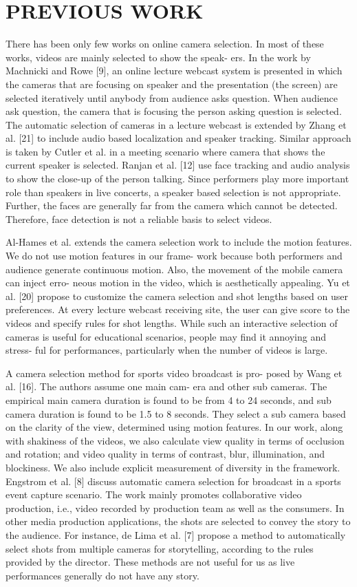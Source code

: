 \documentclass{sig-alternate}
\begin{document}
\section{PREVIOUS WORK}
There has been only few works on online camera selection. In
most of these works, videos are mainly selected to show the speak-
ers. In the work by Machnicki and Rowe [9], an online lecture
webcast system is presented in which the cameras that are focusing
on speaker and the presentation (the screen) are selected iteratively
until anybody from audience asks question. When audience ask
question, the camera that is focusing the person asking question is
selected. The automatic selection of cameras in a lecture webcast
is extended by Zhang et al. [21] to include audio based localization
and speaker tracking. Similar approach is taken by Cutler et al. \cite{asd:zxc}
in a meeting scenario where camera that shows the current speaker
is selected. Ranjan et al. [12] use face tracking and audio analysis to show the close-up of the person talking. Since performers play more important role than speakers in live concerts, a speaker
based selection is not appropriate. Further, the faces are generally
far from the camera which cannot be detected. Therefore, face detection is not a reliable basis to select videos.

Al-Hames et al. \cite{hames:ml} extends the camera selection work to include
the motion features. We do not use motion features in our frame-
work because both performers and audience generate continuous
motion. Also, the movement of the mobile camera can inject erro-
neous motion in the video, which is aesthetically appealing. Yu et
al. [20] propose to customize the camera selection and shot lengths
based on user preferences. At every lecture webcast receiving site,
the user can give score to the videos and specify rules for shot
lengths. While such an interactive selection of cameras is useful
for educational scenarios, people may find it annoying and stress-
ful for performances, particularly when the number of videos is
large.

A camera selection method for sports video broadcast is pro-
posed by Wang et al. [16]. The authors assume one main cam-
era and other sub cameras. The empirical main camera duration is
found to be from 4 to 24 seconds, and sub camera duration is found
to be 1.5 to 8 seconds. They select a sub camera based on the clarity of the view, determined using motion features. In our work, along with shakiness of the videos, we also calculate view quality in terms of occlusion and rotation; and video quality in terms of contrast, blur, illumination, and blockiness. We also include
explicit measurement of diversity in the framework. Engstrom et
al. [8] discuss automatic camera selection for broadcast in a sports
event capture scenario. The work mainly promotes collaborative
video production, i.e., video recorded by production team as well
as the consumers.
In other media production applications, the shots are selected to
convey the story to the audience. For instance, de Lima et al. [7] propose a method to automatically select shots from multiple cameras for storytelling, according to the rules provided by the director.
These methods are not useful for us as live performances generally
do not have any story.
\end{document}
